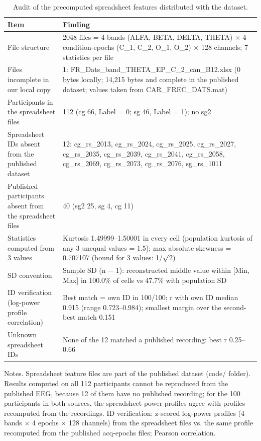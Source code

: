 \begin{table}[htbp]
\centering
\caption{Audit of the precomputed spreadsheet features distributed with the dataset.}
\label{tab:TableS5}
\footnotesize
\begin{tabular}{p{3.5cm}p{11.0cm}}
\toprule
Item & Finding \\
\midrule
File structure & 2048 files = 4 bands (ALFA, BETA, DELTA, THETA) $\times$ 4 condition-epochs (C\_1, C\_2, O\_1, O\_2) $\times$ 128 channels; 7 statistics per file \\
Files incomplete in our local copy & 1: FR\_Dats\_band\_THETA\_EP\_C\_2\_can\_B12.xlsx (0 bytes locally; 14,215 bytes and complete in the published dataset; values taken from CAR\_FREC\_DATS.mat) \\
Participants in the spreadsheet files & 112 (cg 66, Label = 0; sg 46, Label = 1); no sg2 \\
Spreadsheet IDs absent from the published dataset & 12: cg\_rs\_2013, cg\_rs\_2024, cg\_rs\_2025, cg\_rs\_2027, cg\_rs\_2035, cg\_rs\_2039, cg\_rs\_2041, cg\_rs\_2058, cg\_rs\_2069, cg\_rs\_2073, cg\_rs\_2076, sg\_rs\_1011 \\
Published participants absent from the spreadsheet files & 40 (sg2 25, sg 4, cg 11) \\
Statistics computed from 3 values & Kurtosis 1.49999--1.50001 in every cell (population kurtosis of any 3 unequal values = 1.5); max absolute skewness = 0.707107 (bound for 3 values: 1/$\surd$2) \\
SD convention & Sample SD (n $-$ 1): reconstructed middle value within [Min, Max] in 100.0\% of cells vs 47.7\% with population SD \\
ID verification (log-power profile correlation) & Best match = own ID in 100/100; r with own ID median 0.915 (range 0.723--0.984); smallest margin over the second-best match 0.151 \\
Unknown spreadsheet IDs & None of the 12 matched a published recording: best r 0.25--0.66 \\
\bottomrule
\end{tabular}
\par\smallskip
\begin{minipage}{\textwidth}\raggedright\scriptsize
Notes. Spreadsheet feature files are part of the published dataset (code/ folder). Results computed on all 112 participants cannot be reproduced from the published EEG, because 12 of them have no published recording; for the 100 participants in both sources, the spreadsheet power profiles agree with profiles recomputed from the recordings. ID verification: z-scored log-power profiles (4 bands $\times$ 4 epochs $\times$ 128 channels) from the spreadsheet files vs. the same profile recomputed from the published acq-epochs files; Pearson correlation.
\end{minipage}
\end{table}
